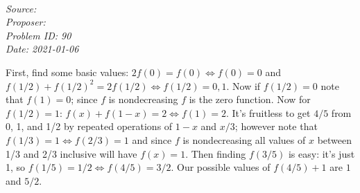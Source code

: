   
\SSbreak\\
\emph{Source: \Cop}\\
\emph{Proposer: \Paiya}\\ %
\emph{Problem ID: 90}\\
\emph{Date: 2021-01-06}\\
\SSbreak

\bigskip

\begin{solution}\hfil\medskip
	
	First, find some basic values: $2f(0) = f(0) \iff f(0) = 0$ and $f(1/2) + f(1/2)^2 = 2f(1/2) \iff f(1/2) = 0, 1$. Now if $f(1/2) = 0$ note that $f(1) = 0$; since $f$ is nondecreasing $f$ is the zero function. Now for $f(1/2) = 1$: $f(x) + f(1 - x) = 2 \iff f(1) = 2$. It's fruitless to get $4/5$ from 0, 1, and 1/2 by repeated operations of $1 - x$ and $x/3$; however note that $f(1/3) = 1 \iff f(2/3) = 1$ and since $f$ is nondecreasing all values of $x$ between 1/3 and 2/3 inclusive will have $f(x) = 1$. Then finding $f(3/5)$ is easy: it's just 1, so $f(1/5) = 1/2 \iff f(4/5) = 3/2$. Our possible values of $f(4/5) + 1$ are $1$ and $5/2$.
\end{solution}\bigskip
